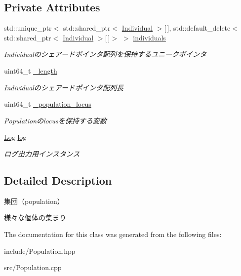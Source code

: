 \subsection*{Private Attributes}
\begin{DoxyCompactItemize}
\item 
\mbox{\label{class_g_a_1_1_population_aab745d770cf42b7c2f0817e3b028689d}} 
std\+::unique\+\_\+ptr$<$ std\+::shared\+\_\+ptr$<$ \mbox{\hyperlink{class_g_a_1_1_individual}{Individual}} $>$\mbox{[}$\,$\mbox{]}, std\+::default\+\_\+delete$<$ std\+::shared\+\_\+ptr$<$ \mbox{\hyperlink{class_g_a_1_1_individual}{Individual}} $>$\mbox{[}$\,$\mbox{]}$>$ $>$ \mbox{\hyperlink{class_g_a_1_1_population_aab745d770cf42b7c2f0817e3b028689d}{individuals}}
\begin{DoxyCompactList}\small\item\em Individualのシェアードポインタ配列を保持するユニークポインタ \end{DoxyCompactList}\item 
\mbox{\label{class_g_a_1_1_population_a10e07cdeda4b84792cd7761f35079770}} 
uint64\+\_\+t \mbox{\hyperlink{class_g_a_1_1_population_a10e07cdeda4b84792cd7761f35079770}{\+\_\+length}}
\begin{DoxyCompactList}\small\item\em Individualのシェアードポインタ配列長 \end{DoxyCompactList}\item 
\mbox{\label{class_g_a_1_1_population_aeb1fd098be08f34a663fb8b3f10b3937}} 
uint64\+\_\+t \mbox{\hyperlink{class_g_a_1_1_population_aeb1fd098be08f34a663fb8b3f10b3937}{\+\_\+population\+\_\+locus}}
\begin{DoxyCompactList}\small\item\em Populationのlocusを保持する変数 \end{DoxyCompactList}\item 
\mbox{\label{class_g_a_1_1_population_a98499a0a682339d3d62d79fae9f23396}} 
\mbox{\hyperlink{class_g_a_1_1_log}{Log}} \mbox{\hyperlink{class_g_a_1_1_population_a98499a0a682339d3d62d79fae9f23396}{log}}
\begin{DoxyCompactList}\small\item\em ログ出力用インスタンス \end{DoxyCompactList}\end{DoxyCompactItemize}


\subsection{Detailed Description}
集団（population） 

様々な個体の集まり 

The documentation for this class was generated from the following files\+:\begin{DoxyCompactItemize}
\item 
include/Population.\+hpp\item 
src/Population.\+cpp\end{DoxyCompactItemize}
